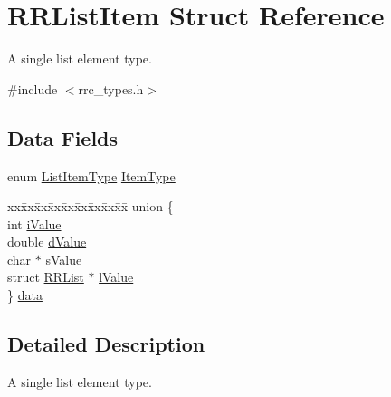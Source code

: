 \hypertarget{struct_r_r_list_item}{\section{R\+R\+List\+Item Struct Reference}
\label{struct_r_r_list_item}
}


A single list element type.  




{\ttfamily \#include $<$rrc\+\_\+types.\+h$>$}

\subsection*{Data Fields}
\begin{DoxyCompactItemize}
\item 
enum \hyperlink{rrc__types_8h_ab99437ab2e88aa90b7ebb8add042b25e}{List\+Item\+Type} \hyperlink{struct_r_r_list_item_a25c3073c0827a19b3ec0a0ea6d2ad5df}{Item\+Type}
\item 
\begin{tabbing}
xx\=xx\=xx\=xx\=xx\=xx\=xx\=xx\=xx\=\kill
union \{\\
\>int \hyperlink{struct_r_r_list_item_ac5de02e20d85842177a764866cef4ad2}{iValue}\\
\>double \hyperlink{struct_r_r_list_item_ada9c8889b93084880c4bed9c9feeaa42}{dValue}\\
\>char $\ast$ \hyperlink{struct_r_r_list_item_a80e5abe988376805a91503e24e8d1efd}{sValue}\\
\>struct \hyperlink{struct_r_r_list}{RRList} $\ast$ \hyperlink{struct_r_r_list_item_afa0e0bc7c68d478c6819e82bedb5525f}{lValue}\\
\} \hyperlink{struct_r_r_list_item_ac5bcd1de26b6efabd485bce48ecf8a8a}{data}\\

\end{tabbing}\end{DoxyCompactItemize}


\subsection{Detailed Description}
A single list element type. 

